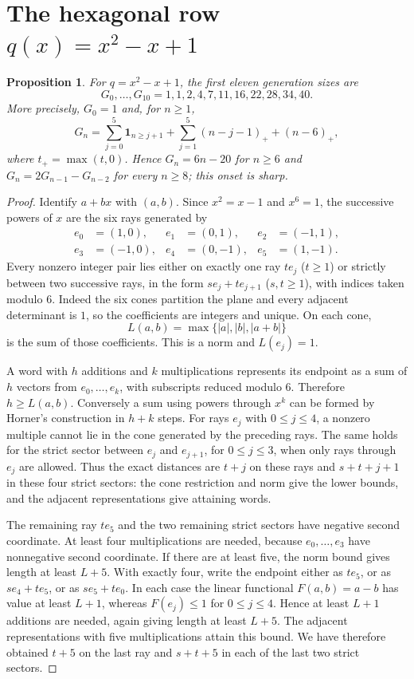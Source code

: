 \documentclass[11pt]{article}
\newtheorem{proposition}[theorem]{Proposition}
\begin{document}
\section{The hexagonal row \texorpdfstring{$q(x)=x^2-x+1$}{q(x)=x2-x+1}}
\begin{proposition}\label{prop:hex}
For $q=x^2-x+1$, the first eleven generation sizes are
\[
G_0,\ldots,G_{10}=1,1,2,4,7,11,16,22,28,34,40.
\]
More precisely, $G_0=1$ and, for $n\geq1$,
\begin{equation}\label{eq:hexcount}
G_n=\sum_{j=0}^{5}\mathbf1_{n\geq j+1}
       +\sum_{j=1}^{5}(n-j-1)_+ +(n-6)_+,
\end{equation}
where $t_+=\max(t,0)$. Hence $G_n=6n-20$ for $n\geq6$ and
$G_n=2G_{n-1}-G_{n-2}$ for every $n\geq8$; this onset is sharp.
\end{proposition}
\begin{proof}
Identify $a+bx$ with $(a,b)$. Since $x^2=x-1$ and $x^6=1$, the
successive powers of $x$ are the six rays generated by
\[
 \begin{aligned}
 e_0&=(1,0),& e_1&=(0,1),& e_2&=(-1,1),\\
 e_3&=(-1,0),& e_4&=(0,-1),& e_5&=(1,-1).
 \end{aligned}
\]
Every nonzero integer pair lies either on exactly one ray $t e_j$
($t\geq1$) or strictly between two successive rays, in the form
$s e_j+t e_{j+1}$ ($s,t\geq1$), with indices taken modulo $6$.
Indeed the six cones partition the plane and every adjacent determinant
is $1$, so the coefficients are integers and unique. On each cone,
\[
 L(a,b)=\max\{|a|,|b|,|a+b|\}
\]
is the sum of those coefficients. This is a norm and $L(e_j)=1$.

A word with $h$ additions and $k$ multiplications represents its
endpoint as a sum of $h$ vectors from $e_0,\ldots,e_k$, with subscripts
reduced modulo $6$. Therefore $h\geq L(a,b)$.
Conversely a sum using powers through $x^k$ can be formed by Horner's
construction in $h+k$ steps.
For rays $e_j$ with $0\leq j\leq4$, a nonzero multiple cannot lie in
the cone generated by the preceding rays. The same holds for the
strict sector between $e_j$ and $e_{j+1}$, for $0\leq j\leq3$,
when only rays through $e_j$ are allowed. Thus the exact distances are
$t+j$ on these rays and $s+t+j+1$ in these four strict sectors:
the cone restriction and norm give the lower bounds, and the adjacent
representations give attaining words.

The remaining ray $t e_5$ and the two remaining strict sectors have
negative second coordinate. At least four multiplications are needed,
because $e_0,\ldots,e_3$ have nonnegative second coordinate. If there
are at least five, the norm bound gives length at least $L+5$.
With exactly four, write the endpoint either as $t e_5$, or as
$s e_4+t e_5$, or as $s e_5+t e_0$. In each case the linear functional
$F(a,b)=a-b$ has value at least $L+1$, whereas
$F(e_j)\leq1$ for $0\leq j\leq4$. Hence at least $L+1$ additions
are needed, again giving length at least $L+5$.
The adjacent representations with five multiplications attain this
bound. We have therefore obtained $t+5$ on the last ray and
$s+t+5$ in each of the last two strict sectors.


\end{proof}
\end{document}
